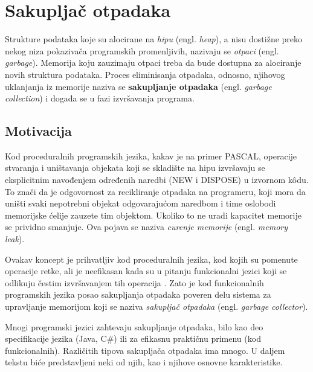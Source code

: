 \section{Sakupljač otpadaka}
\label{sec:djubretar}


Strukture podataka koje su alocirane na \textit{hipu} (engl. \textit{heap}), a nisu dostižne preko nekog niza pokazivača programskih promenljivih, nazivaju se \textit{otpaci} (engl. \textit{garbage}). Memorija koju zauzimaju otpaci treba da bude dostupna za alociranje novih struktura podataka. Proces eliminisanja otpadaka, odnosno, njihovog uklanjanja iz memorije naziva se \textbf{sakupljanje otpadaka} (engl. \textit{garbage collection}) i događa se u fazi izvršavanja programa.

\subsection{Motivacija}

Kod proceduralnih programskih jezika, kakav je na primer PASCAL, operacije stvaranja i uništavanja objekata koji se skladište na hipu izvršavaju se eksplicitnim navođenjem određenih naredbi (NEW i DISPOSE) u izvornom k\^odu. To znači da je odgovornost za recikliranje otpadaka na programeru, koji mora da uništi svaki nepotrebni objekat odgovarajućom naredbom i time oslobodi memorijske ćelije zauzete tim objektom. Ukoliko to ne uradi kapacitet memorije se prividno smanjuje. Ova pojava se naziva \textit{curenje memorije} (engl. \textit{memory leak}).

Ovakav koncept je prihvatljiv kod proceduralnih jezika, kod kojih su pomenute operacije retke, ali je neefikasan kada su u pitanju funkcionalni jezici koji se odlikuju čestim izvršavanjem tih operacija \cite{appel}. Zato je kod funkcionalnih programskih jezika posao sakupljanja otpadaka poveren delu sistema za upravljanje memorijom koji se naziva \textit{sakupljač otpadaka} (engl. \textit{garbage collector}).

Mnogi programski jezici zahtevaju sakupljanje otpadaka, bilo kao deo specifikacije jezika (Java, C\#) ili za efikasnu praktičnu primenu (kod funkcionalnih). Različitih tipova sakupljača otpadaka ima mnogo. U daljem tekstu biće predstavljeni neki od njih, kao i njihove osnovne karakteristike.

